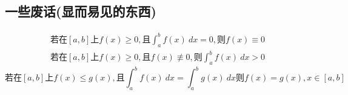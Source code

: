 \subsection{一些废话(显而易见的东西)}
	\begin{align}
		\mbox{若在}\left[a,b\right]\mbox{上}f(x)\geqslant 0,\mbox{且}\int_{a}^{b}f(x)\ dx = 0,\mbox{则}f(x)\equiv 0 \label{Definite_integral_identity_1}\\
		\mbox{若在}\left[a,b\right]\mbox{上}f(x)\geqslant 0,\mbox{且}f(x)\not\equiv 0,\mbox{则}\int_{a}^{b}f(x)\ dx > 0 \label{Definite_integral_identity_2}
	\end{align}
	\begin{equation}
			\mbox{若在}\left[a,b\right]\mbox{上}f(x)\leqslant g(x),\mbox{且}\int_{a}^{b}f(x)\ dx=\int_{a}^{b}g(x)\ dx\mbox{则}f(x)=g(x),x\in\left[a,b\right] \label{Definite_integral_identity_3}
	\end{equation}
